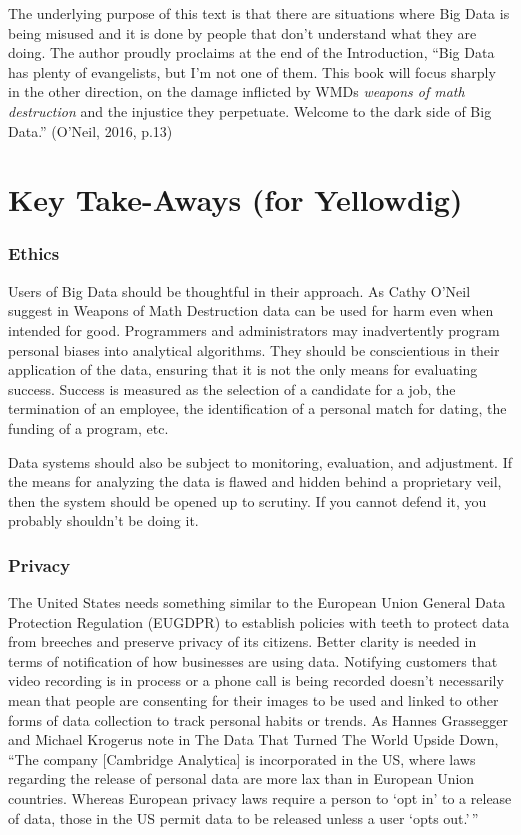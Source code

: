 \documentclass[]{book}
\theoremstyle{definition}
\theoremstyle{definition}
\theoremstyle{definition}
\theoremstyle{remark}
\begin{document}
The underlying purpose of this text is that there are situations where
Big Data is being misused and it is done by people that don't understand
what they are doing. The author proudly proclaims at the end of the
Introduction, ``Big Data has plenty of evangelists, but I'm not one of
them. This book will focus sharply in the other direction, on the damage
inflicted by WMDs \emph{weapons of math destruction} and the injustice
they perpetuate. Welcome to the dark side of Big Data.'' (O'Neil, 2016,
p.13)

\hypertarget{key-take-aways-for-yellowdig-3}{%
\section{Key Take-Aways (for
Yellowdig)}\label{key-take-aways-for-yellowdig-3}}

\hypertarget{ethics}{%
\subsubsection{Ethics}\label{ethics}}

Users of Big Data should be thoughtful in their approach. As Cathy
O'Neil suggest in Weapons of Math Destruction data can be used for harm
even when intended for good. Programmers and administrators may
inadvertently program personal biases into analytical algorithms. They
should be conscientious in their application of the data, ensuring that
it is not the only means for evaluating success. Success is measured as
the selection of a candidate for a job, the termination of an employee,
the identification of a personal match for dating, the funding of a
program, etc.

Data systems should also be subject to monitoring, evaluation, and
adjustment. If the means for analyzing the data is flawed and hidden
behind a proprietary veil, then the system should be opened up to
scrutiny. If you cannot defend it, you probably shouldn't be doing it.

\hypertarget{privacy}{%
\subsubsection{Privacy}\label{privacy}}

The United States needs something similar to the European Union General
Data Protection Regulation (EUGDPR) to establish policies with teeth to
protect data from breeches and preserve privacy of its citizens. Better
clarity is needed in terms of notification of how businesses are using
data. Notifying customers that video recording is in process or a phone
call is being recorded doesn't necessarily mean that people are
consenting for their images to be used and linked to other forms of data
collection to track personal habits or trends. As Hannes Grassegger and
Michael Krogerus note in The Data That Turned The World Upside Down,
``The company {[}Cambridge Analytica{]} is incorporated in the US, where
laws regarding the release of personal data are more lax than in
European Union countries. Whereas European privacy laws require a person
to `opt in' to a release of data, those in the US permit data to be
released unless a user `opts out.'\,''
\end{document}
